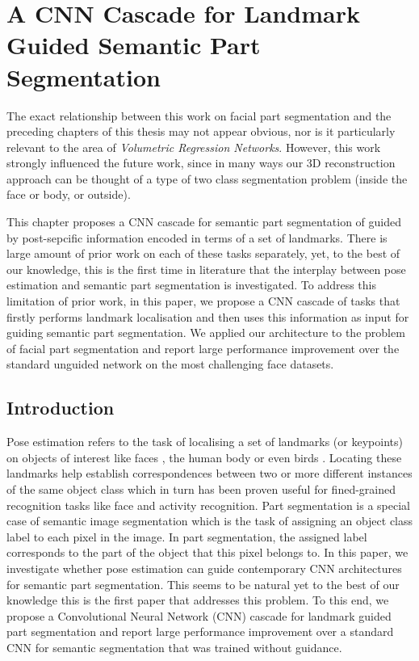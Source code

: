 \graphicspath{{chapter_seg/}}
\chapter{A CNN Cascade for Landmark Guided Semantic Part Segmentation}
\label{chapter:seg}

The exact relationship between this work on facial part segmentation
and the preceding chapters of this thesis may not appear obvious, nor
is it particularly relevant to the area of \textit{Volumetric
  Regression Networks}. However, this work strongly influenced the
future work, since in many ways our 3D reconstruction approach can be
thought of a type of two class segmentation problem (inside the face
or body, or outside).


This chapter proposes a CNN cascade for semantic part segmentation of
guided by post-sepcific information encoded in terms of a set of
landmarks. There is large amount of prior work on each of these tasks
separately, yet, to the best of our knowledge, this is the first time
in literature that the interplay between pose estimation and semantic
part segmentation is investigated. To address this limitation of prior
work, in this paper, we propose a CNN cascade of tasks that firstly
performs landmark localisation and then uses this information as input
for guiding semantic part segmentation. We applied our architecture to
the problem of facial part segmentation and report large performance
improvement over the standard unguided network on the most challenging
face datasets.


\section{Introduction}

Pose estimation refers to the task of localising a set of landmarks
(or keypoints) on objects of interest like faces
\cite{cootes2001active}, the human body \cite{yang2011articulated} or
even birds \cite{zhang2015fine}. Locating these landmarks help
establish correspondences between two or more different instances of
the same object class which in turn has been proven useful for
fined-grained recognition tasks like face and activity
recognition. Part segmentation is a special case of semantic image
segmentation which is the task of assigning an object class label to
each pixel in the image. In part segmentation, the assigned label
corresponds to the part of the object that this pixel belongs to. In
this paper, we investigate whether pose estimation can guide
contemporary CNN architectures for semantic part segmentation. This
seems to be natural yet to the best of our knowledge this is the first
paper that addresses this problem. To this end, we propose a
Convolutional Neural Network (CNN) cascade for landmark guided part
segmentation and report large performance improvement over a standard
CNN for semantic segmentation that was trained without guidance.

